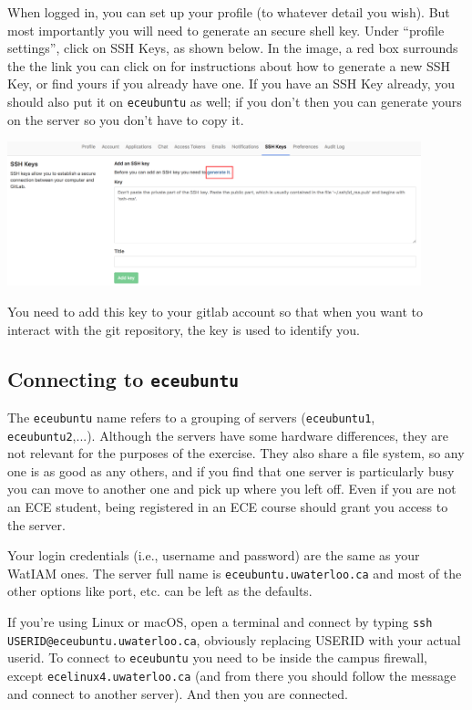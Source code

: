 When logged in, you can set up your profile (to whatever detail you wish). But most importantly you will need to generate an secure shell key. Under ``profile settings'', click on SSH Keys, as shown below. In the image, a red box surrounds the the link you can click on for instructions about how to generate a new SSH Key, or find yours if you already have one. If you have an SSH Key already, you should also put it on \texttt{eceubuntu} as well; if you don't then you can generate yours on the server so you don't have to copy it.

\begin{center}
	\includegraphics[width=0.9\textwidth]{images/gitlab-sshkey.png}
\end{center}

You need to add this key to your gitlab account so that when you want to interact with the git repository, the key is used to identify you.

\subsection*{Connecting to \texttt{eceubuntu}}

The \texttt{eceubuntu} name refers to a grouping of servers (\texttt{eceubuntu1}, \texttt{eceubuntu2},...). Although the servers have some hardware differences, they are not relevant for the purposes of the exercise. They also share a file system, so any one is as good as any others, and if you find that one server is particularly busy you can move to another one and pick up where you left off. Even if you are not an ECE student, being registered in an ECE course should grant you access to the server.

Your login credentials (i.e., username and password) are the same as your WatIAM ones. The server full name is \texttt{eceubuntu.uwaterloo.ca} and most of the other options like port, etc. can be left as the defaults.

If you're using Linux or macOS, open a terminal and connect by typing \texttt{ssh USERID@eceubuntu.uwaterloo.ca}, obviously replacing USERID with your actual userid. To connect to \texttt{eceubuntu} you need to be inside the campus firewall, except \texttt{ecelinux4.uwaterloo.ca} (and from there you should follow the message and connect to another server). And then you are connected.

